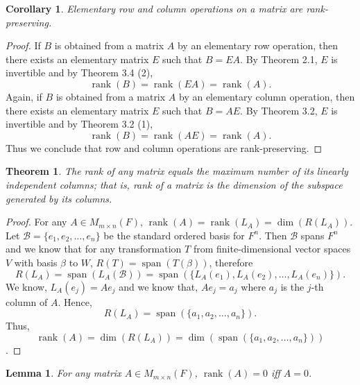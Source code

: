 \documentclass[12pt, a4paper]{article}
\newtheorem{theorem}{Theorem}[section]
\newtheorem{lemma}{Lemma}[section]
\newtheorem{corollary}{Corollary}[theorem]
\theoremstyle{definition}
\theoremstyle{remark}
\newcommand{\B}{\mathscr{B}}
\DeclareMathOperator{\Span}{span}
\DeclareMathOperator{\rank}{rank}
\begin{document}
\begin{corollary}
Elementary row and column operations on a matrix are rank-preserving.
\end{corollary}

\begin{proof}
If $B$ is obtained from a matrix $A$ by an elementary row operation, then there exists an elementary matrix $E$ such that $B = EA$. By Theorem 2.1, $E$ is invertible and by Theorem 3.4 (2),
\[
\rank(B) = \rank(EA) = \rank(A).
\]
Again, if $B$ is obtained from a matrix $A$ by an elementary column operation, then there exists an elementary matrix $E$ such that $B = AE$. By Theorem 3.2, $E$ is invertible and by Theorem 3.2 (1),
\[
\rank(B) = \rank(AE) = \rank(A).
\]
Thus we conclude that row and column operations are rank-preserving.
\end{proof}

\begin{theorem}
The rank of any matrix equals the maximum number of its linearly independent columns; that is, rank of a matrix is the dimension of the subspace generated by its columns.
\end{theorem}

\begin{proof}
For any $A \in M_{m \times n}(F)$, $\rank(A) = \rank(L_A) = \dim(R(L_A))$. Let $\B = \{e_1, e_2, \dots, e_n\}$ be the standard ordered basis for $F^n$. Then $\B$ spans $F^n$ and we know that for any transformation $T$ from finite-dimensional vector spaces $V$ with basis $\beta$ to $W$, $R(T) = \Span(T(\beta))$, therefore
\[
R(L_A) = \Span(L_A(\B)) = \Span(\{L_A(e_1), L_A(e_2), \dots, L_A(e_n)\}).
\]
We know, $L_A(e_j) = Ae_j$ and we know that, $Ae_j = a_j$ where $a_j$ is the $j$-th column of $A$. Hence,
\[
R(L_A) = \Span(\{a_1, a_2, \dots, a_n\}).
\]
Thus, \[\rank(A) = \dim(R(L_A)) = \dim(\Span(\{a_1, a_2, \dots, a_n\}))\].
\end{proof}

\begin{lemma}
For any matrix $A \in M_{m \times n}(F)$, $\rank(A) = 0$ iff $A = 0$.
\end{lemma}
\end{document}
